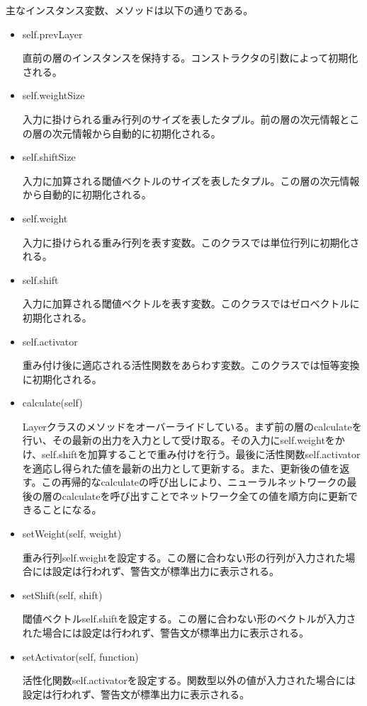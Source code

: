 \documentclass{ujarticle} %
\begin{document}
主なインスタンス変数、メソッドは以下の通りである。
\begin{itemize}
  \item self.prevLayer

  直前の層のインスタンスを保持する。コンストラクタの引数によって初期化される。

  \item self.weightSize

  入力に掛けられる重み行列のサイズを表したタプル。前の層の次元情報とこの層の次元情報から自動的に初期化される。

  \item self.shiftSize

  入力に加算される閾値ベクトルのサイズを表したタプル。この層の次元情報から自動的に初期化される。

  \item self.weight

  入力に掛けられる重み行列を表す変数。このクラスでは単位行列に初期化される。

  \item self.shift

  入力に加算される閾値ベクトルを表す変数。このクラスではゼロベクトルに初期化される。

  \item self.activator

  重み付け後に適応される活性関数をあらわす変数。このクラスでは恒等変換に初期化される。

  \item calculate(self)

  Layerクラスのメソッドをオーバーライドしている。まず前の層のcalculateを行い、その最新の出力を入力として受け取る。その入力にself.weightをかけ、self.shiftを加算することで重み付けを行う。最後に活性関数self.activatorを適応し得られた値を最新の出力として更新する。また、更新後の値を返す。この再帰的なcalculateの呼び出しにより、ニューラルネットワークの最後の層のcalculateを呼び出すことでネットワーク全ての値を順方向に更新できることになる。

  \item setWeight(self, weight)

  重み行列self.weightを設定する。この層に合わない形の行列が入力された場合には設定は行われず、警告文が標準出力に表示される。

  \item setShift(self, shift)

  閾値ベクトルself.shiftを設定する。この層に合わない形のベクトルが入力された場合には設定は行われず、警告文が標準出力に表示される。

  \item setActivator(self, function)

  活性化関数self.activatorを設定する。関数型以外の値が入力された場合には設定は行われず、警告文が標準出力に表示される。
\end{itemize}
\end{document}
